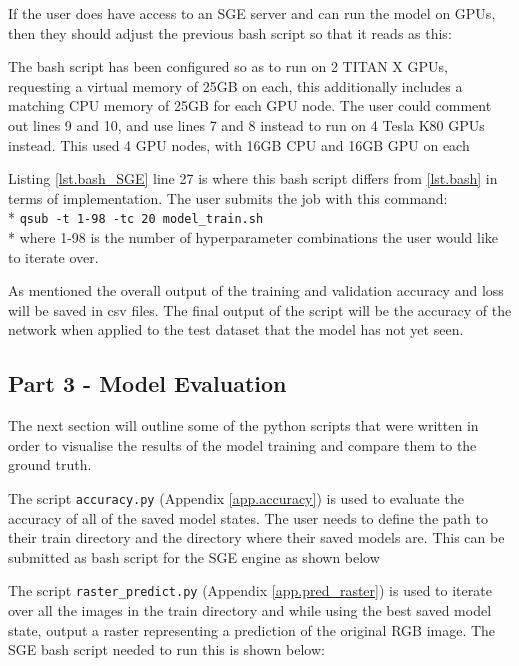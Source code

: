 If the user does have access to an SGE server and can run the model on GPUs, then they should adjust the previous bash script so that it reads as this:



The bash script has been configured so as to run on 2 TITAN X GPUs, requesting a virtual memory of 25GB on each, this additionally includes a matching CPU memory of 25GB for each GPU node. The user could comment out lines 9 and 10, and use lines 7 and 8 instead to run on 4 Tesla K80 GPUs instead. This used 4 GPU nodes, with 16GB CPU and 16GB GPU on each
\par
Listing \ref{lst.bash_SGE} line 27 is where this bash script differs from \ref{lst.bash} in terms of implementation. The user submits the job with this command: \medskip \\* \texttt{qsub -t 1-98 -tc 20 model\_train.sh}  \medskip \\* where 1-98 is the number of hyperparameter combinations the user would like to iterate over.
\par
As mentioned the overall output of the training and validation accuracy and loss will be saved in csv files. The final output of the script will be the accuracy of the network when applied to the test dataset that the model has not yet seen. 

\subsection*{Part 3 - Model Evaluation}
The next section will outline some of the python scripts that were written in order to visualise the results of the model training and compare them to the ground truth. 
\par
The script \texttt{accuracy.py} (Appendix \ref{app.accuracy}) is used to evaluate the accuracy of all of the saved model states. The user needs to define the path to their train directory and the directory where their saved models are.
This can be submitted as bash script for the SGE engine as shown below



\par
The script \texttt{raster\_predict.py} (Appendix \ref{app.pred_raster}) is used to iterate over all the images in the train directory and while using the best saved model state, output a raster representing a prediction of the original RGB image. The SGE bash script needed to run this is shown below:

